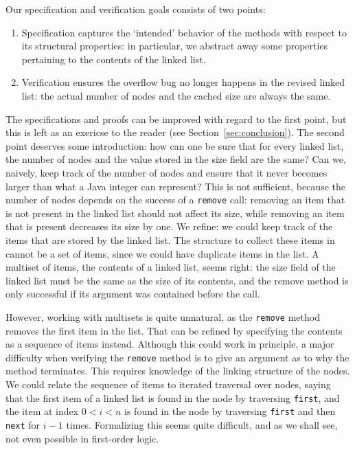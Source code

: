 \documentclass[runningheads]{llncs}
\begin{document}
Our specification and verification goals consists of two points:

\begin{enumerate}
    \item Specification captures the `intended' behavior of the methods with respect to its structural properties: in particular, we abstract away some properties pertaining to the contents of the linked list.
    \item Verification ensures the overflow bug no longer happens in the revised linked list: the actual number of nodes and the cached size are always the same.
\end{enumerate}

The specifications and proofs can be improved with regard to the first point, but this is left as an exericse to the reader (see Section~\ref{sec:conclusion}). The second point deserves some introduction: how can one be sure that for every linked list, the number of nodes and the value stored in the size field are the same? Can we, naively, keep track of the number of nodes and ensure that it never becomes larger than what a Java integer can represent? This is not sufficient, because the number of nodes depends on the success of a \texttt{remove} call: removing an item that is not present in the linked list should not affect its size, while removing an item that is present decreases its size by one. We refine: we could keep track of the items that are stored by the linked list. The structure to collect these items in cannot be a set of items, since we could have duplicate items in the list. A multiset of items, the contents of a linked list, seems right: the size field of the linked list must be the same as the size of its contents, and the remove method is only successful if its argument was contained before the call.

However, working with multisets is quite unnatural, as the \texttt{remove} method removes the first item in the list. That can be refined by specifying the contents as a sequence of items instead. Although this could work in principle, a major difficulty when verifying the \texttt{remove} method is to give an argument as to why the method terminates. This requires knowledge of the linking structure of the nodes. We could relate the sequence of items to iterated traversal over nodes, saying that the first item of a linked list is found in the node by traversing \texttt{first}, and the item at index $0<i<n$ is found in the node by traversing \texttt{first} and then \texttt{next} for $i-1$ times. Formalizing this seems quite difficult, and as we shall see, not even possible in first-order logic.
\end{document}
